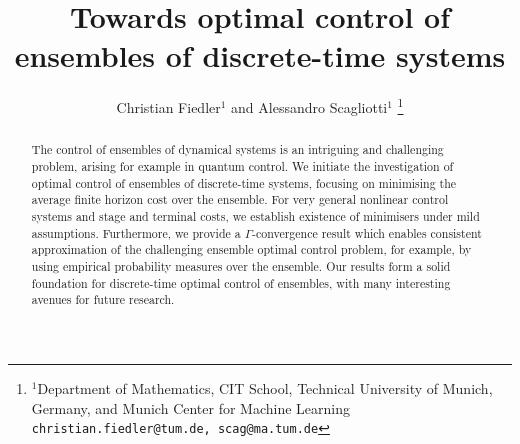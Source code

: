 \documentclass[letterpaper, 10 pt, conference]{IEEEconf}  %
\title{\LARGE \bf
Towards optimal control of ensembles of discrete-time systems
}
\author{Christian Fiedler$^{1}$ and Alessandro Scagliotti$^{1}$%
\thanks{$^{1}$Department of Mathematics, CIT School, Technical University of Munich, Germany, and Munich Center for Machine Learning
        {\tt\small christian.fiedler@tum.de, scag@ma.tum.de}%
}}
\theoremstyle{theorem}
\theoremstyle{definition}
\theoremstyle{remark}
\begin{document}
\maketitle
\thispagestyle{empty}
\pagestyle{empty}


\begin{abstract}
The control of ensembles of dynamical systems is an intriguing and challenging problem, arising for example in quantum control.
We initiate the investigation of optimal control of ensembles of discrete-time systems, focusing on minimising the average finite horizon cost over the ensemble.
For very general nonlinear control systems and stage and terminal costs, we establish existence of minimisers under mild assumptions.
Furthermore, we provide a $\Gamma$-convergence result which enables consistent approximation of the challenging ensemble optimal control problem,
for example, by using empirical probability measures over the ensemble.
Our results form a solid foundation for discrete-time optimal control of ensembles, with many interesting avenues for future research.
\end{abstract}
\end{document}
